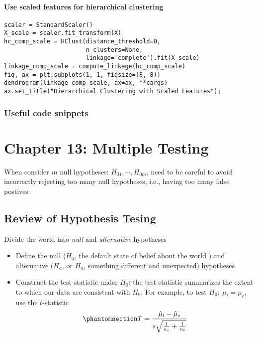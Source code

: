 \documentclass[
  letterpaper,
  DIV=11,
  numbers=noendperiod]{scrreprt}
\providecommand{\tightlist}{%
  \setlength{\itemsep}{0pt}\setlength{\parskip}{0pt}}\usepackage{longtable,booktabs,array}
\begin{document}
\subsubsection{Use scaled features for hierarchical
clustering}\label{use-scaled-features-for-hierarchical-clustering}

\begin{verbatim}
scaler = StandardScaler()
X_scale = scaler.fit_transform(X)
hc_comp_scale = HClust(distance_threshold=0,
                       n_clusters=None,
                       linkage='complete').fit(X_scale)
linkage_comp_scale = compute_linkage(hc_comp_scale)
fig, ax = plt.subplots(1, 1, figsize=(8, 8))
dendrogram(linkage_comp_scale, ax=ax, **cargs)
ax.set_title("Hierarchical Clustering with Scaled Features");
\end{verbatim}

\subsection{Useful code snippets}\label{useful-code-snippets-5}


\chapter{Chapter 13: Multiple
Testing}\label{chapter-13-multiple-testing}

When consider \(m\) null hypotheses: \(H_{01}, \cdots, H_{0m}\), need to
be careful to avoid incorrectly rejecting too many null hypotheses,
i.e., having too many false postives.

\section{Review of Hypothesis Tesing}\label{review-of-hypothesis-tesing}

Divide the world into \emph{null} and \emph{alternative} hypotheses

\begin{itemize}
\tightlist
\item
  Define the null (\(H_0\), the default state of belief about the world
  ) and alternative (\(H_a\), or \(H_a\), something different and
  unexpected) hypotheses
\item
  Construct the test statistic under \(H_0\): the test statistic
  summarizes the extent to which our data are consistent with \(H_0\).
  For example, to test \(H_0: \ \mu_t =\mu_c\), use the \(t\)-statistic
  \begin{equation}\phantomsection\label{eq-two-sample-test}{
  T=\frac{\hat{\mu}_t - \hat{\mu}_c}{s\sqrt{\frac{1}{n_c}+ \frac{1}{n_t}}}
  }\end{equation}
\end{itemize}
\end{document}
